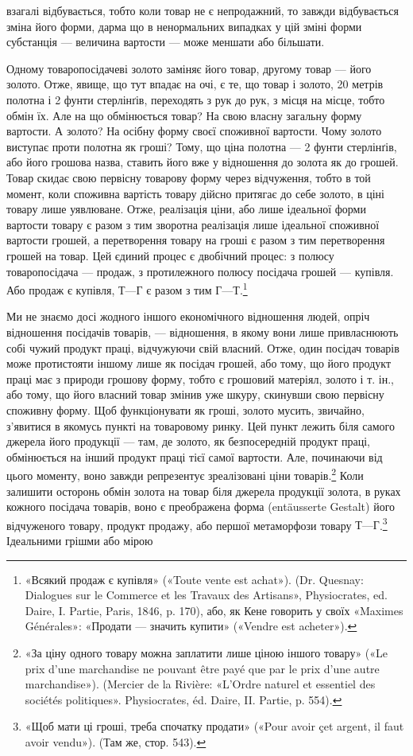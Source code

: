 \parcont{}  %
взагалі відбувається, тобто коли товар не є непродажний, то
завжди відбувається зміна його форми, дарма що в ненормальних
випадках у цій зміні форми субстанція — величина вартости —
може меншати або більшати.

Одному товаропосідачеві золото заміняє його товар, другому
товар — його золото. Отже, явище, що тут впадає на очі, є те, що
товар і золото, 20 метрів полотна і 2 фунти стерлінґів, переходять
з рук до рук, з місця на місце, тобто обмін їх. Але на що обмінюється
товар? На свою власну загальну форму вартости. А золото?
На осібну форму своєї споживної вартости. Чому золото
виступає проти полотна як гроші? Тому, що ціна полотна —
2 фунти стерлінґів, або його грошова назва, ставить його вже у
відношення до золота як до грошей. Товар скидає свою первісну
товарову форму через відчуження, тобто в той момент, коли споживна
вартість товару дійсно притягає до себе золото, в ціні товару
лише уявлюване. Отже, реалізація ціни, або лише ідеальної форми
вартости товару є разом з тим зворотна реалізація лише ідеальної
споживної вартости грошей, а перетворення товару на гроші є
разом з тим перетворення грошей на товар. Цей єдиний процес
є двобічний процес: з полюсу товаропосідача — продаж, з протилежного
полюсу посідача грошей — купівля. Або продаж є купівля,
$Т — Г$ є разом з тим $Г — Т$.\footnote{
«Всякий продаж є купівля» («Toute vente est achat»). (Dr. Quesnay:
Dialogues sur le Commerce et les Travaux des Artisans», Physiocrates,
ed. Daire, I. Partie, Paris, 1846, p. 170), або, як Кене говорить у своїх
«Maximes Générales»: «Продати — значить купити» («Vendre est acheter»).
}

Ми не знаємо досі жодного іншого економічного відношення
людей, опріч відношення посідачів товарів, — відношення, в
якому вони лише привласнюють собі чужий продукт праці, відчужуючи
свій власний. Отже, один посідач товарів може протистояти
іншому лише як посідач грошей, або тому, що його продукт
праці має з природи грошову форму, тобто є грошовий матеріял,
золото і т. ін., або тому, що його власний товар змінив уже
шкуру, скинувши свою первісну споживну форму. Щоб функціонувати
як гроші, золото мусить, звичайно, з’явитися в якомусь
пункті на товаровому ринку. Цей пункт лежить біля самого
джерела його продукції — там, де золото, як безпосередній продукт
праці, обмінюється на інший продукт праці тієї самої вартости.
Але, починаючи від цього моменту, воно завжди репрезентує
зреалізовані ціни товарів.\footnote{
«За ціну одного товару можна заплатити лише ціною іншого товару»
(«Le prix d’une marchandise ne pouvant être payé que par le prix
d’une autre marchandise»). (Mercier de la Rivière: «L’Ordre naturel et
essentiel des sociétés politiques». Physiocrates, éd. Daire, II. Partie, p. 554).
} Коли залишити осторонь
обмін золота на товар біля джерела продукції золота, в руках
кожного посідача товарів, воно є преображена форма (entäusserte
Gestalt) його відчуженого товару, продукт продажу, або першої
метаморфози товару $Т — Г$.\footnote{
«Щоб мати ці гроші, треба спочатку продати» («Pour avoir çet
argent, il faut avoir vendu»). (Там же, стор. 543).
} Ідеальними грішми або мірою
\parbreak{}  %
